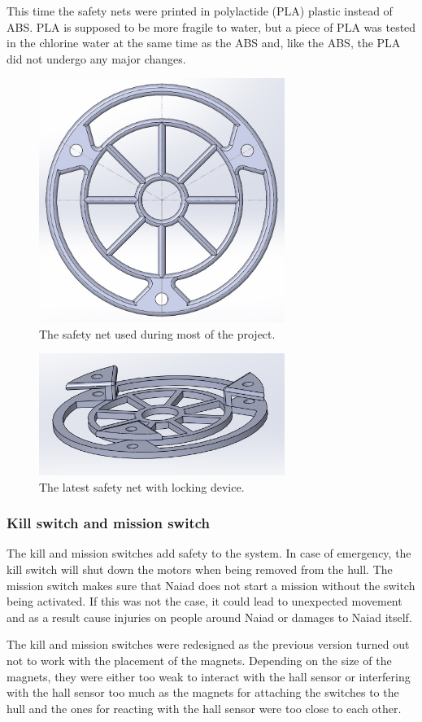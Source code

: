 This time the safety nets were printed in polylactide (PLA) plastic instead of ABS. PLA is supposed to be more fragile to water, but a piece of PLA was tested in the chlorine water at the same time as the ABS and, like the ABS, the PLA did not undergo any major changes.

\begin{figure}[!ht]
	\begin{center}
		\includegraphics[width=80mm]{./Images/Mechanics/Safety_Net.jpg}
		\caption{The safety net used during most of the project.}
		\label{heej}
	\end{center}
\end{figure}

\begin{figure}[!ht]
	\begin{center}
		\includegraphics[width=80mm]{./Images/Mechanics/Safety_Net_With_Addon.jpg}
		\caption{The latest safety net with locking device.}
		\label{heeej}
	\end{center}
\end{figure}

	
	\subsubsection{Kill switch and mission switch}
\noindent The kill and mission switches add safety to the system. In case of emergency, the kill switch will shut down the motors when being removed from the hull. The mission switch makes sure that Naiad does not start a mission without the switch being activated. If this was not the case, it could lead to unexpected movement and as a result cause injuries on people around Naiad or damages to Naiad itself. 

The kill and mission switches were redesigned as the previous version turned out not to work with the placement of the magnets. Depending on the size of the magnets, they were either too weak to interact with the hall sensor or interfering with the hall sensor too much as the magnets for attaching the switches to the hull and the ones for reacting with the hall sensor were too close to each other.  
